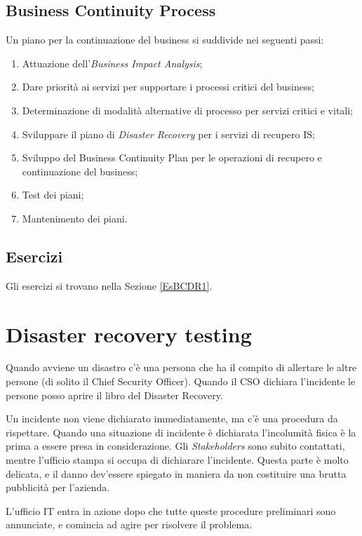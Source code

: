 \subsection{Business Continuity Process}

Un piano per la continuazione del business si suddivide nei seguenti passi:
\begin{enumerate}
  \item Attuazione dell'\textit{Business Impact Analysis};
  \item Dare priorità ai servizi per supportare i processi critici del
  business;
  \item Determinazione di modalità alternative di processo per servizi critici
  e vitali;
  \item Sviluppare il piano di \textit{Disaster Recovery} per i servizi di
  recupero IS;
  \item Sviluppo del Business Continuity Plan per le operazioni di recupero e
  continuazione del business;
  \item Test dei piani;
  \item Mantenimento dei piani.
\end{enumerate}

\subsection{Esercizi}

Gli esercizi si trovano nella Sezione \ref{EsBCDR1}.

\section{Disaster recovery testing}

Quando avviene un disastro c'è una persona che ha il compito di allertare le
altre persone (di solito il Chief Security Officer). Quando il CSO dichiara
l'incidente le persone posso aprire il libro del Disaster Recovery.

Un incidente non viene dichiarato immediatamente, ma c'è una procedura da
rispettare. Quando una situazione di incidente è dichiarata l'incolumità fisica
è la prima a essere presa in considerazione. Gli \textit{Stakeholders} sono
subito contattati, mentre l'ufficio stampa si occupa di dichiarare l'incidente.
Questa parte è molto delicata, e il danno dev'essere spiegato in maniera da non
costituire una brutta pubblicità per l'azienda.

L'ufficio IT entra in azione dopo che tutte queste procedure preliminari sono
annunciate, e comincia ad agire per risolvere il problema.

